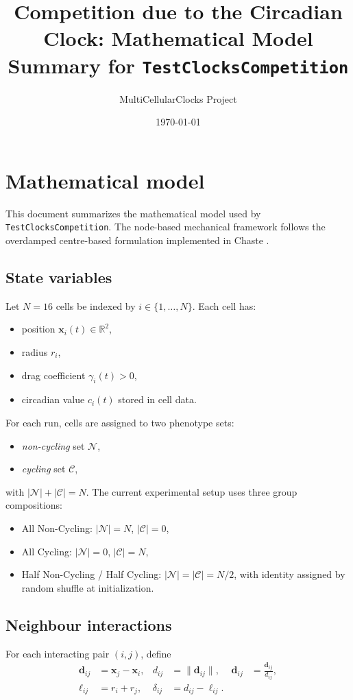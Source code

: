 \documentclass[11pt]{article}
\title{Competition due to the Circadian Clock: Mathematical Model Summary for \texttt{TestClocksCompetition}}
\author{MultiCellularClocks Project}
\date{\today}
\begin{document}
\maketitle

\section{Mathematical model}
This document summarizes the mathematical model used by
\texttt{TestClocksCompetition}. The node-based mechanical framework follows the
overdamped centre-based formulation implemented in Chaste \cite{mirams2013chaste}.

\subsection{State variables}
Let \(N=16\) cells be indexed by \(i\in\{1,\dots,N\}\).
Each cell has:
\begin{itemize}
  \item position \(\mathbf{x}_i(t)\in\mathbb{R}^2\),
  \item radius \(r_i\),
  \item drag coefficient \(\gamma_i(t)>0\),
  \item circadian value \(c_i(t)\) stored in cell data.
\end{itemize}

For each run, cells are assigned to two phenotype sets:
\begin{itemize}
  \item \emph{non-cycling} set \(\mathcal{N}\),
  \item \emph{cycling} set \(\mathcal{C}\),
\end{itemize}
with \(|\mathcal{N}|+|\mathcal{C}|=N\). The current experimental setup uses three
group compositions:
\begin{itemize}
  \item All Non-Cycling: \(|\mathcal{N}|=N\), \(|\mathcal{C}|=0\),
  \item All Cycling: \(|\mathcal{N}|=0\), \(|\mathcal{C}|=N\),
  \item Half Non-Cycling / Half Cycling: \(|\mathcal{N}|=|\mathcal{C}|=N/2\), with
  identity assigned by random shuffle at initialization.
\end{itemize}

\subsection{Neighbour interactions}
For each interacting pair \((i,j)\), define
\begin{align}
\mathbf{d}_{ij} &= \mathbf{x}_j-\mathbf{x}_i, & d_{ij}&=\|\mathbf{d}_{ij}\|, & \hat{\mathbf{d}}_{ij}&=\frac{\mathbf{d}_{ij}}{d_{ij}},\\
\ell_{ij} &= r_i+r_j, & \delta_{ij}&=d_{ij}-\ell_{ij}.
\label{eq:pair_kinematics}
\end{align}
\end{document}
